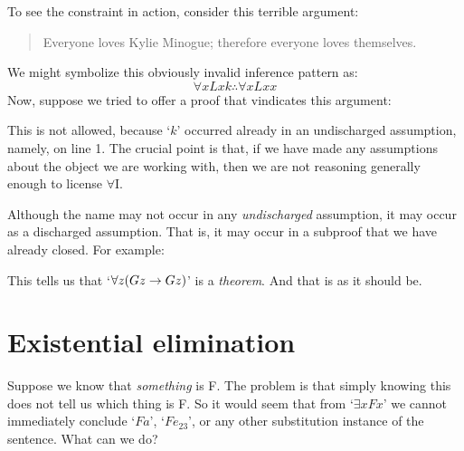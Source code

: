 To see the constraint in action, consider this terrible argument:
	\begin{quote}
		Everyone loves Kylie Minogue; therefore everyone loves themselves.
	\end{quote}
We might symbolize this obviously invalid inference pattern as:
$$\forall x Lxk \therefore \forall x Lxx$$
Now, suppose we tried to offer a proof that vindicates this argument:
\begin{fitchproof}
	 
	 
\end{fitchproof}\noindent
This is not allowed, because `$k$' occurred already in an undischarged assumption, namely, on line 1. The crucial point is that, if we have made any assumptions about the object we are working with, then we are not reasoning generally enough to license $\forall$I.

Although the name may not occur in any \emph{undischarged} assumption, it may occur as a discharged assumption. That is, it may occur in a subproof that we have already closed. For example:
\begin{fitchproof}
	\open
	\close
\end{fitchproof}
This tells us that `$\forall z (Gz \rightarrow Gz)$' is a \emph{theorem}. And that is as it should be.

\section{Existential elimination}
Suppose we know that \emph{something} is F. The problem is that simply knowing this does not tell us which thing is F. So it would seem that from `$\exists x Fx$' we cannot immediately conclude `$Fa$', `$Fe_{23}$', or any other substitution instance of the sentence. What can we do?

